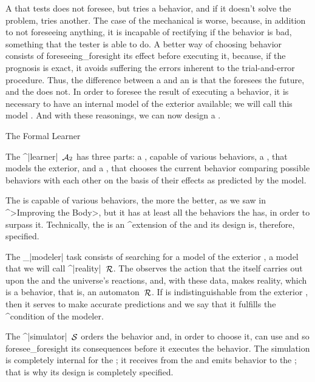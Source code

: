 A {\governor} that tests does not foresee, but tries a behavior, and if
it doesn't solve the problem, tries another. The case of the mechanical
{\governor} is worse, because, in addition to not foreseeing anything,
it is incapable of rectifying if the behavior is bad, something that the
tester is able to do. A better way of choosing behavior consists of
foreseeing_{foresight} its effect before executing it, because, if the
prognosis is exact, it avoids suffering the errors inherent to the
trial-and-error procedure. Thus, the difference between a {\learner} and
an {\adaptor} is that the {\learner} foresees the future, and the
{\adaptor} does not. In order to foresee the result of executing a
behavior, it is necessary to have an internal model of the exterior
available; we will call this model {\reality}. And with these
reasonings, we can now design a {\learner}.


\Section The Formal Learner

The ^|learner|~$\aut A_2$ has three parts: a {\body}, capable of various
behaviors, a {\modeler}, that models the exterior, and a {\simulator},
that chooses the current behavior comparing possible behaviors with each
other on the basis of their effects as predicted by the model.

\point The {\learners} {\body} is capable of various behaviors,
the more the better, as we saw in ^>Improving the Body>, but it has at
least all the behaviors the {\adaptor} has, in order to surpass it.
Technically, the {\learners} {\body} is an ^{extension} of the
{\adaptors} {\body} and its design is, therefore, specified.

\point The {\modelers}_|modeler| task consists of searching for
a model of the exterior {\universe}, a model that we will call
^|reality|~$\aut R$. The {\modeler} observes the action that the
{\learner} itself carries out upon the {\universe} and the universe's
reactions, and, with these data, makes reality, which is a behavior,
that is, an automaton~$\aut R$. If {\reality} is indistinguishable from
the exterior {\universe}, then it serves to make accurate predictions
and we say that it fulfills the ^{condition of the modeler}.

\point The ^|simulator|~$\aut S$ orders the behavior and,
in order to choose it, can use {\reality} and so foresee_{foresight} its
consequences before it executes the behavior. The simulation is
completely internal for the {\learner}; it receives {\reality} from the
{\modeler} and emits behavior to the {\body}; that is why its design is
completely specified.


